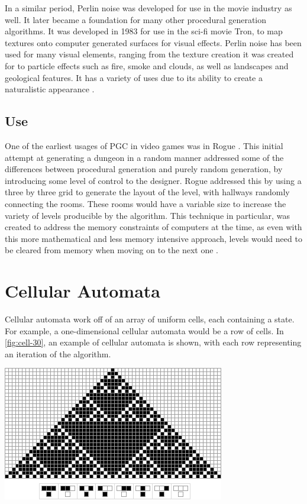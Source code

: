 \documentclass[10pt]{report}
\begin{document}
		In a similar period, Perlin noise was developed for use in the movie industry as well. It later became a foundation for many other procedural generation algorithms. It was developed in 1983 for use in the sci-fi movie Tron, to map textures onto computer generated surfaces for visual effects. Perlin noise has been used for many visual elements, ranging from the texture creation it was created for to particle effects such as fire, smoke and clouds, as well as landscapes and geological features. It has a variety of uses due to its ability to create a naturalistic appearance \cite{10.1145/325165.325247}.
		
		\section{Use}
		One of the earliest usages of PGC in video games was in Rogue \cite{rogue}. This initial attempt at generating a dungeon in a random manner addressed some of the differences between procedural generation and purely random generation, by introducing some level of control to the designer. Rogue addressed this by using a three by three grid to generate the layout of the level, with hallways randomly connecting the rooms. These rooms would have a variable size to increase the variety of levels producible by the algorithm. This technique in particular, was created to address the memory constraints of computers at the time, as even with this more mathematical and less memory intensive approach, levels would need to be cleared from memory when moving on to the next one \cite{rogue}.
		
		

	\vspace{10pt}
	\let\clearpage\relax
	\chapter{Cellular Automata}
		Cellular automata work off of an array of uniform cells, each containing a state. For example, a one-dimensional cellular automata would be a row of cells. In \autoref{fig:cell-30}, an example of cellular automata is shown, with each row representing an iteration of the algorithm.
		
		\begin{minipage}{\textwidth}
			\centering
			\includegraphics[scale=0.8]{rule-30}
			\label{fig:cell-30}
		\end{minipage}
	
\end{document}
